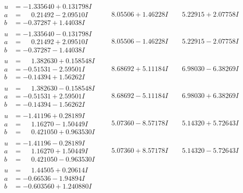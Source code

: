 \documentclass[1p]{elsarticle_modified}
\theoremstyle{definition}
\begin{document}
$$\begin{array}{c|c|c}
\begin{aligned}
u &= -1.335640 + 0.131798 I \\
a &= \phantom{-}0.21492 - 2.09510 I \\
b &= -0.37287 + 1.44038 I\end{aligned}
 & \phantom{-}8.05506 + 1.46228 I & \phantom{-}5.22915 + 2.07758 I \\ \hline\begin{aligned}
u &= -1.335640 - 0.131798 I \\
a &= \phantom{-}0.21492 + 2.09510 I \\
b &= -0.37287 - 1.44038 I\end{aligned}
 & \phantom{-}8.05506 - 1.46228 I & \phantom{-}5.22915 - 2.07758 I \\ \hline\begin{aligned}
u &= \phantom{-}1.382630 + 0.158548 I \\
a &= -0.51531 - 2.59501 I \\
b &= -0.14394 + 1.56262 I\end{aligned}
 & \phantom{-}8.68692 + 5.11184 I & \phantom{-}6.98030 - 6.38269 I \\ \hline\begin{aligned}
u &= \phantom{-}1.382630 - 0.158548 I \\
a &= -0.51531 + 2.59501 I \\
b &= -0.14394 - 1.56262 I\end{aligned}
 & \phantom{-}8.68692 - 5.11184 I & \phantom{-}6.98030 + 6.38269 I \\ \hline\begin{aligned}
u &= -1.41196 + 0.28189 I \\
a &= \phantom{-}1.16270 - 1.50449 I \\
b &= \phantom{-}0.421050 + 0.963530 I\end{aligned}
 & \phantom{-}5.07360 - 8.57178 I & \phantom{-}5.14320 + 5.72643 I \\ \hline\begin{aligned}
u &= -1.41196 - 0.28189 I \\
a &= \phantom{-}1.16270 + 1.50449 I \\
b &= \phantom{-}0.421050 - 0.963530 I\end{aligned}
 & \phantom{-}5.07360 + 8.57178 I & \phantom{-}5.14320 - 5.72643 I \\ \hline\begin{aligned}
u &= \phantom{-}1.44505 + 0.20614 I \\
a &= -0.66536 - 1.94894 I \\
b &= -0.603560 + 1.240880 I\end{aligned}

\end{array}$$
\end{document}

